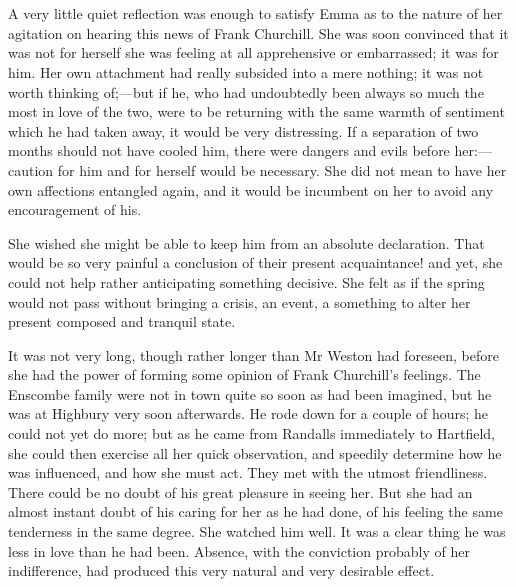 \chapter[Chapter \thechapter]{}
	
	\lettrine[lraise=0.3]{A}{} very little quiet reflection was enough to satisfy Emma as to the nature of her agitation on hearing this news of Frank Churchill. She was soon convinced that it was not for herself she was feeling at all apprehensive or embarrassed; it was for him. Her own attachment had really subsided into a mere nothing; it was not worth thinking of;—but if he, who had undoubtedly been always so much the most in love of the two, were to be returning with the same warmth of sentiment which he had taken away, it would be very distressing. If a separation of two months should not have cooled him, there were dangers and evils before her:—caution for him and for herself would be necessary. She did not mean to have her own affections entangled again, and it would be incumbent on her to avoid any encouragement of his.

She wished she might be able to keep him from an absolute declaration. That would be so very painful a conclusion of their present acquaintance! and yet, she could not help rather anticipating something decisive. She felt as if the spring would not pass without bringing a crisis, an event, a something to alter her present composed and tranquil state.

It was not very long, though rather longer than Mr Weston had foreseen, before she had the power of forming some opinion of Frank Churchill's feelings. The Enscombe family were not in town quite so soon as had been imagined, but he was at Highbury very soon afterwards. He rode down for a couple of hours; he could not yet do more; but as he came from Randalls immediately to Hartfield, she could then exercise all her quick observation, and speedily determine how he was influenced, and how she must act. They met with the utmost friendliness. There could be no doubt of his great pleasure in seeing her. But she had an almost instant doubt of his caring for her as he had done, of his feeling the same tenderness in the same degree. She watched him well. It was a clear thing he was less in love than he had been. Absence, with the conviction probably of her indifference, had produced this very natural and very desirable effect.

